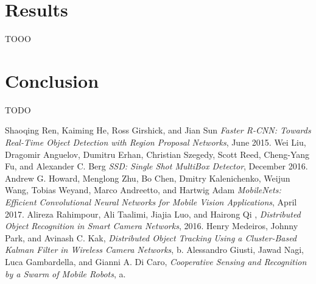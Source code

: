 \documentclass[10pt,conference,compsocconf]{IEEEtran}
\begin{document}
\section{Results}
\label{sec:results}
TOOO
\section{Conclusion}
\label{sec:conclusion}
TODO
\begin{thebibliography}{1}
\label{reference0}
Shaoqing Ren, Kaiming He, Ross Girshick, and Jian Sun \emph{Faster R-CNN: Towards Real-Time Object
Detection with Region Proposal Networks}, June 2015.
\vspace*{-0.8\baselineskip}
\label{reference1}
Wei Liu, Dragomir Anguelov, Dumitru Erhan, Christian Szegedy, Scott Reed, Cheng-Yang Fu, and Alexander C. Berg \emph{SSD: Single Shot MultiBox Detector}, December 2016.
\vspace*{-0.8\baselineskip}
\vspace*{-0.8\baselineskip}
\label{reference2}
Andrew G. Howard, Menglong Zhu, Bo Chen, Dmitry Kalenichenko, Weijun Wang, Tobias Weyand, Marco Andreetto, and Hartwig Adam \emph{MobileNets: Efficient Convolutional Neural Networks for Mobile Vision Applications}, April 2017.
\vspace*{-0.8\baselineskip}
\label{reference3}
Alireza Rahimpour, Ali Taalimi, Jiajia Luo, and Hairong Qi , \emph{Distributed Object Recognition in Smart Camera Networks}, 2016.
\vspace*{-0.8\baselineskip}
\label{reference4}
Henry Medeiros, Johnny Park, and Avinash C. Kak, \emph{Distributed Object Tracking Using a Cluster-Based Kalman Filter in Wireless Camera Networks}, b.
\vspace*{-0.8\baselineskip}
\label{reference5}
Alessandro Giusti, Jawad Nagi, Luca Gambardella, and Gianni A. Di Caro, \emph{Cooperative Sensing and Recognition by a Swarm of Mobile Robots},  a.
\end{thebibliography}
\end{document}
